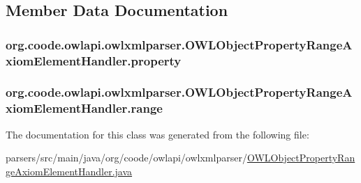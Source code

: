 \subsection{Member Data Documentation}
\hypertarget{classorg_1_1coode_1_1owlapi_1_1owlxmlparser_1_1_o_w_l_object_property_range_axiom_element_handler_a774d57956d5f14cde0db4b9d59205cd6}{
\subsubsection[{property}]{ org.\-coode.\-owlapi.\-owlxmlparser.\-O\-W\-L\-Object\-Property\-Range\-Axiom\-Element\-Handler.\-property\hspace{0.3cm}{\ttfamily [private]}}}\label{classorg_1_1coode_1_1owlapi_1_1owlxmlparser_1_1_o_w_l_object_property_range_axiom_element_handler_a774d57956d5f14cde0db4b9d59205cd6}
\hypertarget{classorg_1_1coode_1_1owlapi_1_1owlxmlparser_1_1_o_w_l_object_property_range_axiom_element_handler_aa158379984412b7c12794af0560a2074}{
\subsubsection[{range}]{ org.\-coode.\-owlapi.\-owlxmlparser.\-O\-W\-L\-Object\-Property\-Range\-Axiom\-Element\-Handler.\-range\hspace{0.3cm}{\ttfamily [private]}}}\label{classorg_1_1coode_1_1owlapi_1_1owlxmlparser_1_1_o_w_l_object_property_range_axiom_element_handler_aa158379984412b7c12794af0560a2074}


The documentation for this class was generated from the following file\-:\begin{DoxyCompactItemize}
\item 
parsers/src/main/java/org/coode/owlapi/owlxmlparser/\hyperlink{_o_w_l_object_property_range_axiom_element_handler_8java}{O\-W\-L\-Object\-Property\-Range\-Axiom\-Element\-Handler.\-java}\end{DoxyCompactItemize}
